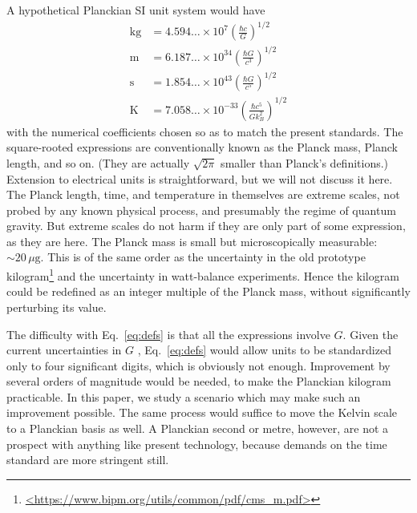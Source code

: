 \documentclass[onecolumn]{aa} %
\begin{document}
A hypothetical Planckian SI unit system would have
\begin{equation} \label{eq:defs}
\begin{aligned}
\mathrm{kg} &= 4.594\ldots \times 10^7
               \left(\frac{\hbar c}{G}\right)^{\!1/2} \\
\mathrm{m}  &= 6.187\ldots \times 10^{34}
               \left(\frac{\hbar G}{c^3}\right)^{\!1/2} \\
\mathrm{s}  &= 1.854\ldots \times 10^{43}
               \left(\frac{\hbar G}{c^5}\right)^{\!1/2} \\
\mathrm{K}  &= 7.058\ldots \times 10^{-33}
               \left(\frac{\hbar c^5}{Gk_B^2}\right)^{\!1/2}
\end{aligned}
\end{equation}
with the numerical coefficients chosen so as to match the present
standards.  The square-rooted expressions are conventionally known as
the Planck mass, Planck length, and so on.  (They are actually
$\sqrt{2\pi}$ smaller than Planck's definitions.)  Extension to
electrical units is straightforward, but we will not discuss it here.
The Planck length, time, and temperature in themselves are extreme
scales, not probed by any known physical process, and presumably the
regime of quantum gravity.  But extreme scales do not harm if they are
only part of some expression, as they are here.  The Planck mass is
small but microscopically measurable: $\sim20\,\mu\mathrm{g}$.  This
is of the same order as the uncertainty in the old prototype
kilogram\footnote{\url{<https://www.bipm.org/utils/common/pdf/cms_m.pdf>}}
and the uncertainty in watt-balance experiments.  Hence the kilogram
could be redefined as an integer multiple of the Planck mass, without
significantly perturbing its value.

The difficulty with Eq.~\eqref{eq:defs} is that all the expressions
involve $G$.  Given the current uncertainties in $G$ \citep{CODATA17},
Eq.~\eqref{eq:defs} would allow units to be standardized only to four
significant digits, which is obviously not enough.  Improvement by
several orders of magnitude would be needed, to make the Planckian
kilogram practicable.  In this paper, we study a scenario which may
make such an improvement possible.  The same process would suffice to
move the Kelvin scale to a Planckian basis as well.  A Planckian
second or metre, however, are not a prospect with anything like
present technology, because demands on the time standard are more
stringent still.
\end{document}
